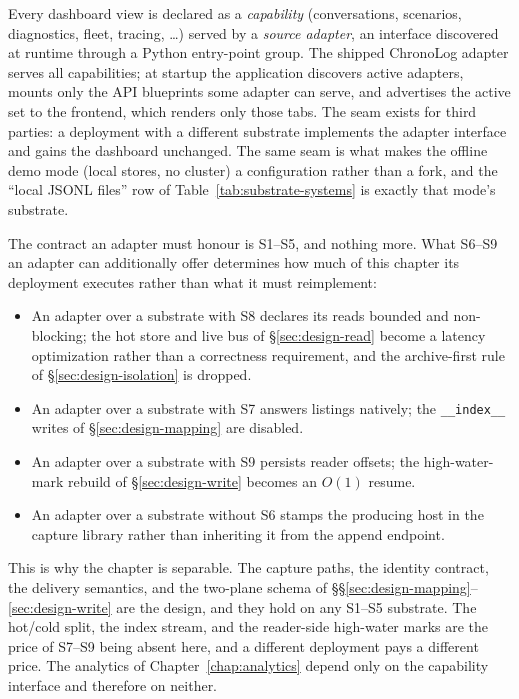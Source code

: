 Every dashboard view is declared as a \emph{capability} (conversations,
scenarios, diagnostics, fleet, tracing, \dots) served by a \emph{source
adapter}, an interface discovered at runtime through a Python
entry-point group. The shipped ChronoLog adapter serves all capabilities;
at startup the application discovers active adapters, mounts only the API
blueprints some adapter can serve, and advertises the active set to the
frontend, which renders only those tabs. The seam exists for third parties:
a deployment with a different substrate implements the adapter interface
and gains the dashboard unchanged. The same seam is what
makes the offline demo mode (local stores, no cluster) a configuration
rather than a fork, and the ``local JSONL files'' row of
Table~\ref{tab:substrate-systems} is exactly that mode's substrate.

The contract an adapter must honour is S1--S5, and nothing more. What
S6--S9 an adapter can additionally offer determines how much of this
chapter its deployment executes rather than what it must reimplement:

\begin{itemize}
\item An adapter over a substrate with S8 declares its reads bounded and
  non-blocking; the hot store and live bus of \S\ref{sec:design-read} become
  a latency optimization rather than a correctness requirement, and the
  archive-first rule of \S\ref{sec:design-isolation} is dropped.
\item An adapter over a substrate with S7 answers listings natively; the
  \texttt{\_\_index\_\_} writes of \S\ref{sec:design-mapping} are disabled.
\item An adapter over a substrate with S9 persists reader offsets; the
  high-water-mark rebuild of \S\ref{sec:design-write} becomes an $O(1)$
  resume.
\item An adapter over a substrate without S6 stamps the producing host in
  the capture library rather than inheriting it from the append endpoint.
\end{itemize}

This is why the chapter is separable. The capture paths, the identity
contract, the delivery semantics, and the two-plane schema of
\S\S\ref{sec:design-mapping}--\ref{sec:design-write} are the design, and
they hold on any S1--S5 substrate. The hot/cold split, the index stream,
and the reader-side high-water marks are the price of S7--S9 being absent
here, and a different deployment pays a different price. The analytics of
Chapter~\ref{chap:analytics} depend only on the capability interface and
therefore on neither.

